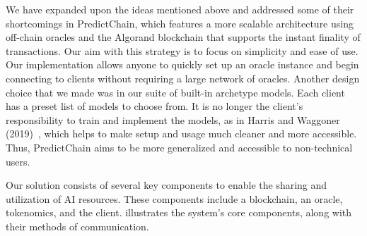 \documentclass{ledger}
\begin{document}
We have expanded upon the ideas mentioned above and addressed some of their shortcomings in PredictChain, which features a more scalable architecture using off-chain oracles and the Algorand blockchain that supports the instant finality of transactions. Our aim with this strategy is to focus on simplicity and ease of use. Our implementation allows anyone to quickly set up an oracle instance and begin connecting to clients without requiring a large network of oracles. Another design choice that we made was in our suite of built-in archetype models. Each client has a preset list of models to choose from. It is no longer the client's responsibility to train and implement the models, as in Harris and Waggoner (2019)~\cite{sharingModels}, which helps to make setup and usage much cleaner and more accessible. Thus, PredictChain aims to be more generalized and accessible to non-technical users.

Our solution consists of several key components to enable the sharing and utilization of AI resources. These components include a blockchain, an oracle, tokenomics, and the client.
 illustrates the system's core components, along with their methods of communication.
\end{document}
